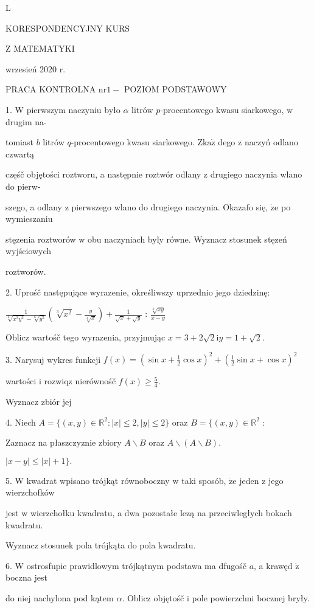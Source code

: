 \documentclass[a4paper,12pt]{article}
\begin{document}
L

KORESPONDENCYJNY KURS

Z MATEMATYKI

wrzesień 2020 r.

PRACA KONTROLNA $\mathrm{n}\mathrm{r} 1 -$ POZIOM PODSTAWOWY

1. $\mathrm{W}$ pierwszym naczyniu było $\alpha$ litrów $p$-procentowego kwasu siarkowego, $\mathrm{w}$ drugim na-

tomiast $b$ litrów $q$-procentowego kwasu siarkowego. $\mathrm{Z}\mathrm{k}\mathrm{a}\dot{\mathrm{z}}$ dego $\mathrm{z}$ naczyń odlano czwartą

częśč objętości roztworu, a następnie roztwór odlany $\mathrm{z}$ drugiego naczynia wlano do pierw-

szego, a odlany $\mathrm{z}$ pierwszego wlano do drugiego naczynia. Okazafo się, $\dot{\mathrm{z}}\mathrm{e}$ po wymieszaniu

stęzenia roztworów $\mathrm{w}$ obu naczyniach byly równe. Wyznacz stosunek stęzeń wyjściowych

roztworów.

2. Uprośč następujące wyrazenie, określiwszy uprzednio jego dziedzinę:

$\displaystyle \frac{1}{\sqrt[6]{x^{3}y^{2}}-\sqrt[6]{y^{5}}}(\sqrt[3]{x^{2}}-\frac{y}{\sqrt[3]{x}})+\frac{1}{\sqrt{x}+\sqrt{y}}$ : $\displaystyle \frac{\sqrt[3]{xy}}{x-y}$

Oblicz wartośč tego wyrazenia, przyjmując $x=3+2\sqrt{2} \mathrm{i} y=1+\sqrt{2}.$

3. Narysuj wykres funkcji $f(x)=(\displaystyle \sin x+\frac{1}{2}\cos x)^{2}+(\frac{1}{2}\sin x+\cos x)^{2}$

wartości $\mathrm{i}$ rozwiqz nierównośč $f(x)\displaystyle \geq\frac{5}{4}.$

Wyznacz zbiór jej

4. Niech $A=\{(x,y)\in \mathbb{R}^{2}:|x|\leq 2,|y|\leq 2\}$ oraz $B=\{(x,y)\in \mathbb{R}^{2}$ :

Zaznacz na płaszczyz$\acute{}$nie zbiory $A\backslash B$ oraz $A\backslash (A\backslash B).$

$|x-y|\leq|x|+1\}.$

5. $\mathrm{W}$ kwadrat wpisano trójkąt równoboczny $\mathrm{w}$ taki sposób, $\dot{\mathrm{z}}\mathrm{e}$ jeden $\mathrm{z}$ jego wierzchofków

jest $\mathrm{w}$ wierzchołku kwadratu, a dwa pozostałe lezą na przeciwległych bokach kwadratu.

Wyznacz stosunek pola trójkąta do pola kwadratu.

6. $\mathrm{W}$ ostrosfupie prawidlowym trójkątnym podstawa ma dfugośč $a$, a krawęd $\acute{\mathrm{z}}$ boczna jest

do niej nachylona pod kątem $\alpha$. Oblicz objętośč $\mathrm{i}$ pole powierzchni bocznej bryły.
\end{document}
